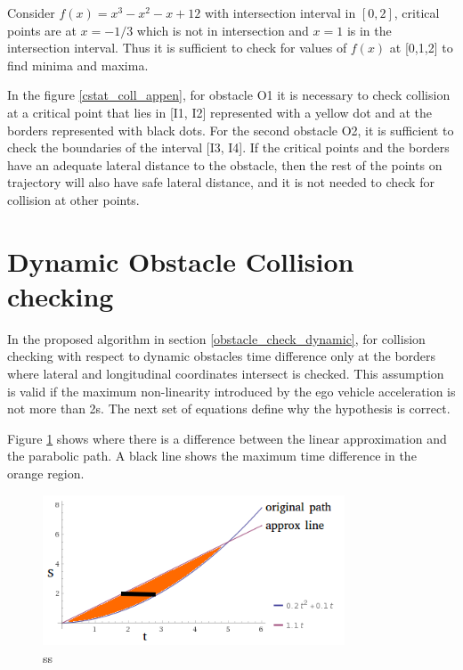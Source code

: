Consider $f(x) = x^3 - x^2 -x + 12$ with intersection interval in $[0,2]$, critical points are at $x=-1/3$ which is not in intersection and $x=1$ is in the intersection interval. Thus it is sufficient to check for values of $f(x)$ at [0,1,2] to find minima and maxima. 

In the figure \ref{cstat_coll_appen}, for obstacle O1 it is necessary to check collision at a critical point that lies in [I1, I2] represented with a yellow dot and at the borders represented with black dots. For the second obstacle O2, it is sufficient to check the boundaries of the interval [I3, I4]. If the critical points and the borders have an adequate lateral distance to the obstacle, then the rest of the points on trajectory will also have safe lateral distance, and it is not needed to check for collision at other points. 


\section{Dynamic Obstacle Collision checking}
\label{dynamic_obst_appendix}

In the proposed algorithm in section \ref{obstacle_check_dynamic}, for collision checking with respect to dynamic obstacles time difference only at the borders where lateral and longitudinal coordinates intersect is checked. This assumption is valid if the maximum non-linearity introduced by the ego vehicle acceleration is not more than 2s. The next set of equations define why the hypothesis is correct. 

Figure \ref{dynamic_approx_appen} shows where there is a difference between the linear approximation and the parabolic path. A black line shows the maximum time difference in the orange region. 

\begin{figure}
	\centering
	\includegraphics[width=0.8\textwidth]{Images/appendix/dynamic_approx.png}
	\caption{ss}
	\label{dynamic_approx_appen}
\end{figure}


